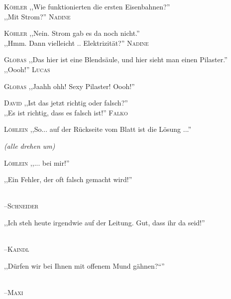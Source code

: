 \vspace{3mm}
\hangindent=0.7cm
\raggedright \textsc{\footnotesize Köhler} ,,Wie funktionierten die ersten Eisenbahnen?''\\
\raggedleft ,,Mit Strom?'' \textsc{\footnotesize Nadine}\\
\hangindent=0.7cm
\raggedright \textsc{\footnotesize Köhler} ,,Nein. Strom gab es da noch nicht.''\\
\raggedleft ,,Hmm. Dann vielleicht .. Elektrizität?'' \textsc{\footnotesize Nadine}\\

\vspace{3mm}
\hangindent=0.7cm
\raggedright \textsc{\footnotesize Globas} ,,Das hier ist eine Blendsäule, und hier sieht man einen Pilaster.''\\
\raggedleft ,,Oooh!'' \textsc{\footnotesize Lucas}\\
\hangindent=0.7cm
\raggedright \textsc{\footnotesize Globas} ,,Jaahh ohh! Sexy Pilaster! Oooh!''\\

\vspace{3mm}
\hangindent=0.7cm
\raggedright \textsc{\footnotesize David} ,,Ist das jetzt richtig oder falsch?''\\
\raggedleft ,,Es ist richtig, dass es falsch ist!'' \textsc{\footnotesize Falko}\\

\vspace{3mm}
\hangindent=0.7cm
\raggedright \textsc{\footnotesize Löhlein} ,,So... auf der  Rückseite vom Blatt ist die Lösung ...''\\
\raggedright \emph{\footnotesize (alle drehen um)}\\
\hangindent=0.7cm
\raggedright \textsc{\footnotesize Löhlein} ,,... bei mir!''\\

\vspace{3mm}
{\raggedright ,,Ein Fehler, der oft falsch gemacht wird!''}\\
\raggedleft \textsc{\footnotesize --\/Schneider}\\

\vspace{3mm}
{\raggedright ,,Ich steh heute irgendwie auf der Leitung. Gut, dass ihr da seid!''}\\
\raggedleft \textsc{\footnotesize --\/Kaindl}\\

\vspace{3mm}
{\raggedright ,,Dürfen wir bei Ihnen mit offenem Mund gähnen?“''}\\
\raggedleft \textsc{\footnotesize --\/Maxi}\\

